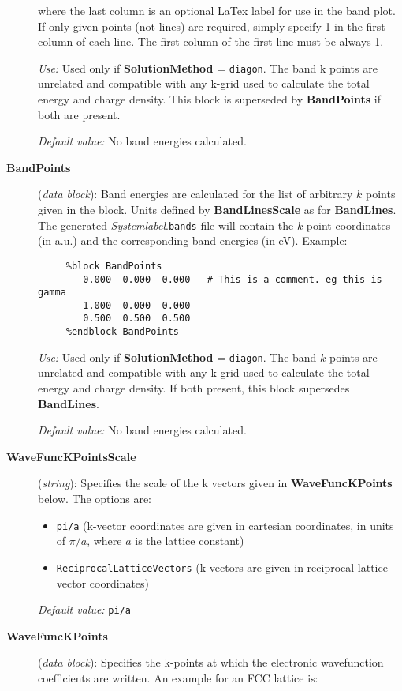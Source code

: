 \documentclass[11pt]{article}
\begin{document}
\begin{description}
where the last column is an optional LaTex label for use in the band plot.
If only given points (not lines) are required, simply specify 1 in the
first column of each line. The first column of the first line must be 
always 1.

{\it Use:} Used only if {\bf SolutionMethod} = {\tt diagon}.
The band k points are unrelated and compatible with any k-grid used
to calculate the total energy and charge density.
This block is superseded by {\bf BandPoints} if both are present.

{\it Default value:} No band energies calculated.

\item[{\bf BandPoints}] ({\it data block}): 
Band energies are calculated for the list of arbitrary $k$ points 
given in the block. Units defined by {\bf BandLinesScale} as 
for {\bf BandLines}. The generated {\it Systemlabel}.{\tt bands} file
will contain the $k$ point coordinates (in a.u.) and the corresponding
band energies (in eV). Example:

\begin{verbatim}
     %block BandPoints
        0.000  0.000  0.000   # This is a comment. eg this is gamma
        1.000  0.000  0.000 
        0.500  0.500  0.500   
     %endblock BandPoints
\end{verbatim}

{\it Use:} Used only if {\bf SolutionMethod} = {\tt diagon}.
The band $k$ points are unrelated and compatible with any k-grid used
to calculate the total energy and charge density. If both present, this 
block supersedes {\bf BandLines}.

{\it Default value:} No band energies calculated.

\item[{\bf WaveFuncKPointsScale}] ({\it string}): 
Specifies the scale of the k vectors given in 
{\bf WaveFuncKPoints} below.
The options are:
\begin{itemize}
\item {\tt pi/a} (k-vector coordinates are given in cartesian 
coordinates, in units of $\pi/a$, where $a$ is the lattice constant)
\item {\tt ReciprocalLatticeVectors} (k vectors are given in
reciprocal-lattice-vector coordinates)
\end{itemize}

{\it Default value:} {\tt pi/a}


\item[{\bf WaveFuncKPoints}] ({\it data block}): 
Specifies the k-points at which the electronic wavefunction
coefficients are written. 
An example for an FCC lattice is:


\end{description}
\end{document}
